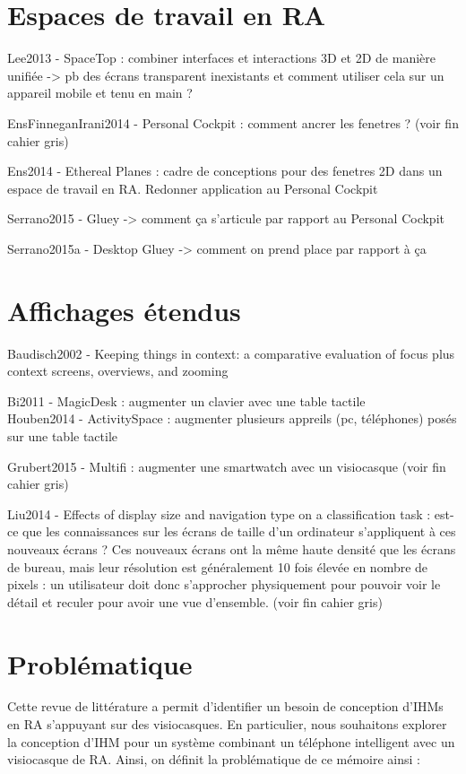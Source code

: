 \section{Espaces de travail en RA}
Lee2013 - SpaceTop : combiner interfaces et interactions 3D et 2D de manière unifiée -> pb des écrans transparent inexistants et comment utiliser cela sur un appareil mobile et tenu en main ?

EnsFinneganIrani2014 - Personal Cockpit : comment ancrer les fenetres ? (voir fin cahier gris)

Ens2014 - Ethereal Planes : cadre de conceptions pour des fenetres 2D dans un espace de travail en RA. Redonner application au Personal Cockpit

Serrano2015 - Gluey -> comment ça s'articule par rapport au Personal Cockpit

Serrano2015a - Desktop Gluey -> comment on prend place par rapport à ça


\section{Affichages étendus}
Baudisch2002 - Keeping things in context: a comparative evaluation of focus plus context screens, overviews, and zooming

Bi2011 - MagicDesk : augmenter un clavier avec une table tactile\\
Houben2014 - ActivitySpace : augmenter plusieurs appreils (pc, téléphones) posés sur une table tactile

Grubert2015 - Multifi : augmenter une smartwatch avec un visiocasque (voir fin cahier gris)

Liu2014 - Effects of display size and navigation type on a classification task : est-ce que les connaissances sur les écrans de taille d'un ordinateur s'appliquent à ces nouveaux écrans ? Ces nouveaux écrans ont la même haute densité que les écrans de bureau, mais leur résolution est généralement 10 fois élevée en nombre de pixels : un utilisateur doit donc s'approcher physiquement pour pouvoir voir le détail et reculer pour avoir une vue d'ensemble. (voir fin cahier gris)


\section{Problématique}
Cette revue de littérature a permit d'identifier un besoin de conception d'IHMs en RA s'appuyant sur des visiocasques. En particulier, nous souhaitons explorer la conception d'IHM pour un système combinant un téléphone intelligent avec un visiocasque de RA. Ainsi, on définit la problématique de ce mémoire ainsi :

